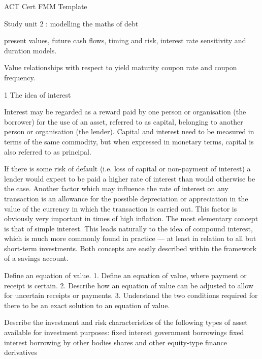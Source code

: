 ACT Cert FMM Template

Study unit 2 : modelling the maths of debt

present values, future cash flows, timing and risk, interest rate sensitivity and duration models.

Value relationships with respect to yield maturity coupon rate and coupon frequency.

1 The idea of interest

Interest may be regarded as a reward paid by one person or organisation (the borrower) for the use of an asset, referred to as capital, belonging to another person or organisation (the lender). Capital and interest need to be measured in terms of the same commodity, but when expressed in monetary terms, capital is also referred to as principal.

If there is some risk of default (i.e. loss of capital or non-payment of interest) a lender would expect to be paid a higher rate of interest than would otherwise be the case.
Another factor which may influence the rate of interest on any transaction is an allowance for the possible depreciation or appreciation in the value of the currency in which the transaction is carried out. This factor is obviously very important in times of high inflation. The most elementary concept is that of simple interest. This leads naturally to the idea of compound interest, which is much more commonly found in practice — at least in relation to all but short-term investments. Both concepts are easily described within the
framework of a savings account.
 
 


Define an equation of value.
1. Define an equation of value, where payment or receipt is certain.
2. Describe how an equation of value can be adjusted to allow for uncertain receipts or payments.
3. Understand the two conditions required for there to be an exact solution to an equation of value.



Describe the investment and risk characteristics of the following types of asset available for investment purposes: fixed interest government borrowings fixed interest borrowing by other bodies shares and other equity-type finance derivatives
